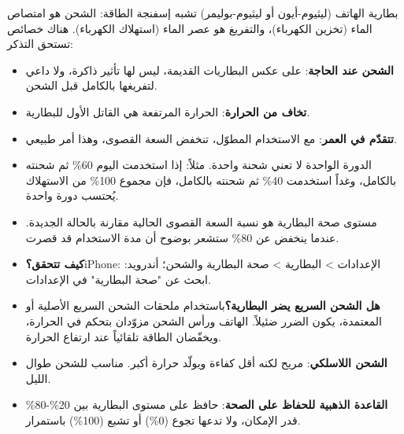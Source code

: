 


بطارية الهاتف (ليثيوم-أيون أو ليثيوم-بوليمر) تشبه إسفنجة الطاقة: الشحن هو امتصاص الماء (تخزين الكهرباء)، والتفريغ هو عصر الماء (استهلاك الكهرباء). هناك خصائص تستحق التذكر:

\begin{itemize}
  \item \textbf{الشحن عند الحاجة}: على عكس البطاريات القديمة، ليس لها تأثير ذاكرة، ولا داعي لتفريغها بالكامل قبل الشحن.
  \item \textbf{تخاف من الحرارة}: الحرارة المرتفعة هي القاتل الأول للبطارية.
  \item \textbf{تتقدّم في العمر}: مع الاستخدام المطوّل، تنخفض السعة القصوى، وهذا أمر طبيعي.
\end{itemize}


\begin{itemize}
  \item الدورة الواحدة لا تعني شحنة واحدة. مثلاً: إذا استخدمت اليوم 60\% ثم شحنته بالكامل، وغداً استخدمت 40\% ثم شحنته بالكامل، فإن مجموع 100\% من الاستهلاك يُحتسب دورة واحدة.
  \item مستوى صحة البطارية هو نسبة السعة القصوى الحالية مقارنة بالحالة الجديدة. عندما ينخفض عن 80\% ستشعر بوضوح أن مدة الاستخدام قد قصرت.
  \item \textbf{كيف تتحقق؟}iPhone: الإعدادات > البطارية > صحة البطارية والشحن؛ أندرويد: ابحث عن "صحة البطارية" في الإعدادات.
\end{itemize}


\begin{itemize}
  \item \textbf{هل الشحن السريع يضر البطارية؟}باستخدام ملحقات الشحن السريع الأصلية أو المعتمدة، يكون الضرر ضئيلاً. الهاتف ورأس الشحن مزوّدان بتحكم في الحرارة، ويخفّضان الطاقة تلقائياً عند ارتفاع الحرارة.
  \item \textbf{الشحن اللاسلكي}: مريح لكنه أقل كفاءة ويولّد حرارة أكبر. مناسب للشحن طوال الليل.
  \item \textbf{القاعدة الذهبية للحفاظ على الصحة}: حافظ على مستوى البطارية بين 20\%-80\% قدر الإمكان، ولا تدعها تجوع (0\%) أو تشبع (100\%) باستمرار.
\end{itemize}

